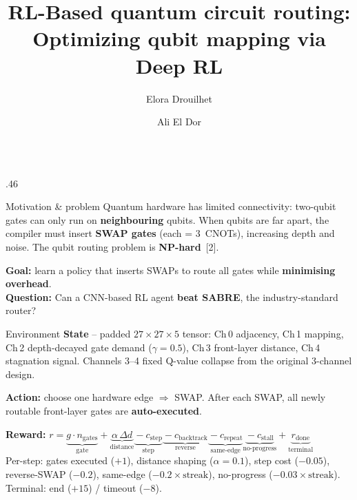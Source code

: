 \documentclass[final]{beamer}
\title{\huge RL-Based quantum circuit routing:\\ Optimizing qubit mapping via Deep RL}
\author{Elora Drouilhet \and Ali El Dor}
\institute[]{CentraleSup\'elec}
\begin{document}
\begin{frame}[fragile]{}

\begin{columns}[t]

\begin{column}{.46\textwidth}

\begin{alertblock}{Motivation \& problem}
\normalsize
Quantum hardware has limited connectivity: two-qubit gates can only run on \textbf{neighbouring} qubits.
When qubits are far apart, the compiler must insert \textbf{SWAP gates} (each = 3~CNOTs), increasing depth and noise.
The qubit routing problem is \textbf{NP-hard}~[2].

\smallskip
\textbf{Goal:} learn a policy that inserts SWAPs to route all gates while \textbf{minimising overhead}.\\
\textbf{Question:} Can a CNN-based RL agent \textbf{beat SABRE}, the industry-standard router?
\end{alertblock}

\vspace{0.05cm}

\begin{block}{Environment}
\textbf{State} -- padded $27\!\times\!27\!\times\!5$ tensor:
Ch\,0 adjacency, Ch\,1 mapping, Ch\,2 depth-decayed gate demand ($\gamma{=}0.5$),
Ch\,3 front-layer distance, Ch\,4 stagnation signal.
Channels 3--4 fixed Q-value collapse from the original 3-channel design.

\smallskip
\textbf{Action:} choose one hardware edge $\Rightarrow$ SWAP.
After each SWAP, all newly routable front-layer gates are \textbf{auto-executed}.

\smallskip
\textbf{Reward:}
$r = \underbrace{g \cdot n_{\text{gates}}}_{\text{gate}} + \underbrace{\alpha\,\Delta d}_{\text{distance}} \underbrace{{}- c_{\text{step}}}_{\text{step}} \underbrace{{}- c_{\text{backtrack}}}_{\text{reverse}} \underbrace{{}- c_{\text{repeat}}}_{\text{same-edge}} \underbrace{{}- c_{\text{stall}}}_{\text{no-progress}} + \underbrace{r_{\text{done}}}_{\text{terminal}}$\\
{\small Per-step: gates executed ($+1$), distance shaping ($\alpha{=}0.1$), step cost ($-0.05$), reverse-SWAP ($-0.2$), same-edge ($-0.2{\times}\text{streak}$), no-progress ($-0.03{\times}\text{streak}$). Terminal: end ($+15$) / timeout ($-8$).}
\end{block}


\end{column}
\end{columns}
\end{frame}
\end{document}
